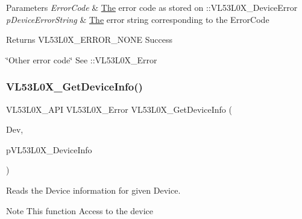 \begin{DoxyParams}{Parameters}
{\em Error\+Code} & \hyperlink{structThe}{The} error code as stored on \+::\+V\+L53\+L0\+X\+\_\+\+Device\+Error \\
\hline
{\em p\+Device\+Error\+String} & \hyperlink{structThe}{The} error string corresponding to the Error\+Code \\
\hline
\end{DoxyParams}
\begin{DoxyReturn}{Returns}
V\+L53\+L0\+X\+\_\+\+E\+R\+R\+O\+R\+\_\+\+N\+O\+NE Success 

\char`\"{}\+Other error code\char`\"{} See \+::\+V\+L53\+L0\+X\+\_\+\+Error 
\end{DoxyReturn}
\mbox{\label{group__VL53L0X__general__group_ga608dd0345885215992789821cb094e17}} 
\subsubsection{\texorpdfstring{V\+L53\+L0\+X\+\_\+\+Get\+Device\+Info()}{VL53L0X\_GetDeviceInfo()}}
{\footnotesize\ttfamily V\+L53\+L0\+X\+\_\+\+A\+PI V\+L53\+L0\+X\+\_\+\+Error V\+L53\+L0\+X\+\_\+\+Get\+Device\+Info (\begin{DoxyParamCaption}\item[{\hyperlink{group__VL53L0X__platform__group_ga2d6405308b1dd524b462f1b8fb97d167}{V\+L53\+L0\+X\+\_\+\+D\+EV}}]{Dev,  }\item[{\hyperlink{structVL53L0X__DeviceInfo__t}{V\+L53\+L0\+X\+\_\+\+Device\+Info\+\_\+t} $\ast$}]{p\+V\+L53\+L0\+X\+\_\+\+Device\+Info }\end{DoxyParamCaption})}



Reads the Device information for given Device. 

\begin{DoxyNote}{Note}
This function Access to the device
\end{DoxyNote}

